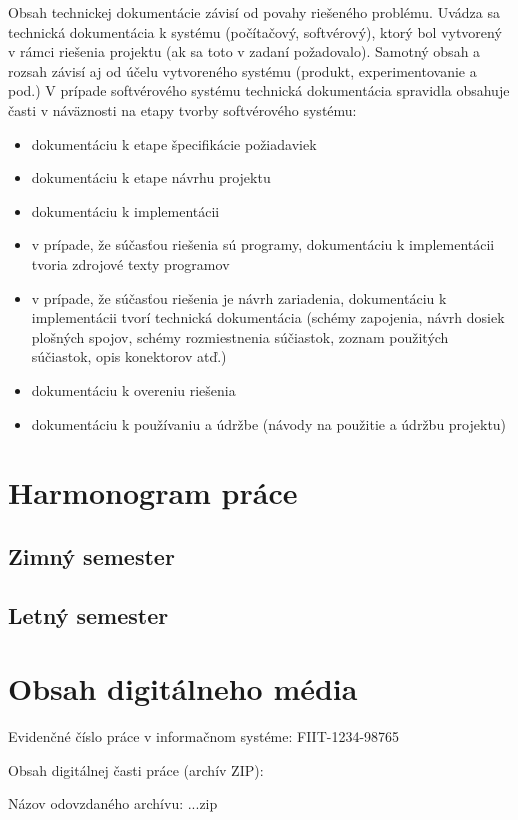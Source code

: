 \documentclass[12pt, a4paper, twoside, openright, slovak]{book}
\newcommand{\RegNo}[0] {FIIT-1234-98765}
\begin{document}
Obsah technickej dokumentácie závisí od povahy riešeného problému. Uvádza sa technická dokumentácia k systému (počítačový, softvérový), ktorý bol vytvorený v rámci riešenia projektu (ak sa toto v zadaní požadovalo). Samotný obsah a rozsah závisí aj od účelu vytvoreného systému (produkt, experimentovanie a pod.)
V prípade softvérového systému technická dokumentácia spravidla obsahuje časti v náväznosti na etapy tvorby softvérového systému:
\begin{itemize}
	\item dokumentáciu k etape špecifikácie požiadaviek
    \item dokumentáciu k etape návrhu projektu
    \item dokumentáciu k implementácii
    \item v prípade, že súčasťou riešenia sú programy, dokumentáciu k implementácii tvoria zdrojové texty programov
    \item v prípade, že súčasťou riešenia je návrh zariadenia, dokumentáciu k implementácii tvorí technická dokumentácia (schémy zapojenia, návrh dosiek plošných spojov, schémy rozmiestnenia súčiastok, zoznam použitých súčiastok, opis konektorov atď.)
    \item dokumentáciu k overeniu riešenia
    \item dokumentáciu k používaniu a údržbe (návody na použitie a údržbu projektu)
\end{itemize}


\thispagestyle{empty}
\chapter{Harmonogram práce}
\renewcommand*{\thepage}{B-\arabic{page}}
\section{Zimný semester}
\section{Letný semester}

\thispagestyle{empty}

\chapter{Obsah digitálneho média}
\renewcommand*{\thepage}{C-\arabic{page}}
\par Evidenčné číslo práce v informačnom systéme: \RegNo
\par Obsah digitálnej časti práce (archív ZIP):
\par Názov odovzdaného archívu: ...zip
\end{document}
